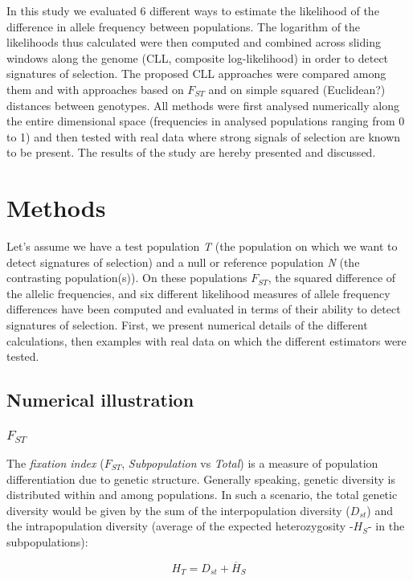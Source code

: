 \documentclass{bmcart}
\begin{document}
In this study we evaluated 6 different ways to estimate the likelihood
of the difference in allele frequency between populations. The logarithm
of the likelihoods thus calculated were then computed and combined across sliding windows
along the genome (CLL, composite log-likelihood) in order to detect
signatures of selection. The proposed CLL approaches were compared among
them and with approaches based on $F_{ST}$ and on simple squared (Euclidean?)
distances between genotypes. All methods were first analysed numerically
along the entire dimensional space (frequencies in analysed populations
ranging from 0 to 1) and then tested with real data where strong signals
of selection are known to be present.
The results of the study are hereby presented and discussed.  

\section*{Methods}

Let's assume we have a test population \emph{T} (the population on which we want to detect
signatures of selection) and a null or reference population \emph{N} (the
contrasting population(s)). On these populations $F_{ST}$, the squared
difference of the allelic frequencies, and six different likelihood
measures of allele frequency differences have been computed and
evaluated in terms of their ability to detect signatures of selection. 
First, we present numerical details of the different calculations, then
examples with real data on which the different estimators were tested.


\subsection*{Numerical illustration}
\subsubsection*{$F_{ST}$}
The \emph{fixation index} ($F_{ST}$, \emph{Subpopulation} vs
\emph{Total}) is a measure of population
differentiation due to genetic structure.
Generally speaking, genetic diversity is distributed within and
among populations. In such a scenario,
the total genetic diversity would be given by the sum of the
interpopulation diversity ($D_{st}$) and the intrapopulation diversity
(average of the expected heterozygosity -$H_S$- in the subpopulations):

\begin{equation}
H_T=D_{st}+\overline{H}_S
\end{equation} 
\end{document}
